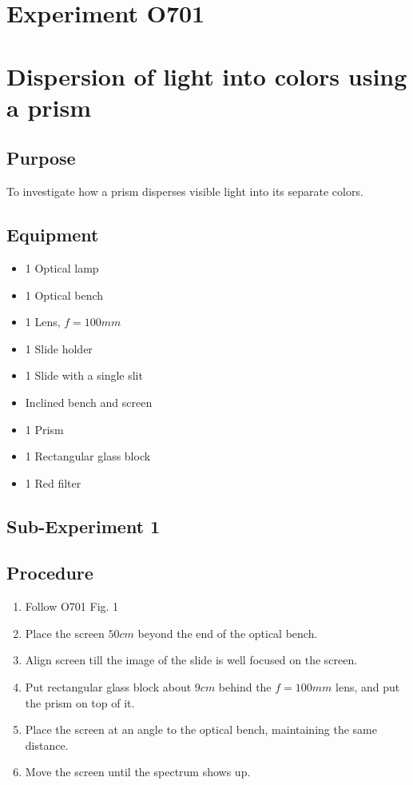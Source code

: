 \documentclass[12pt]{article}
\begin{document}
\section*{Experiment O701}

\section*{Dispersion of light into colors using a prism}

\subsection*{Purpose}

To investigate how a prism disperses visible light into its separate colors.

\subsection*{Equipment}

\begin{itemize}
\item 1 Optical lamp
\item 1 Optical bench
\item 1 Lens, $f=100 mm$
\item 1 Slide holder
\item 1 Slide with a single slit
\item Inclined bench and screen
\item 1 Prism
\item 1 Rectangular glass block
\item 1 Red filter
\end{itemize}


\subsection*{Sub-Experiment 1}

\subsection*{Procedure}

\begin{enumerate}
\item Follow O701 Fig. 1
\item Place the screen $50 cm$ beyond the end of the optical bench.
\item Align screen till the image of the slide is well focused on the screen.
\item Put rectangular glass block about $9cm$ behind the $f=100mm$ lens, and put the prism on top of it.
\item Place the screen at an angle to the optical bench, maintaining the same distance.
\item Move the screen until the spectrum shows up.
\end{enumerate}
\end{document}
